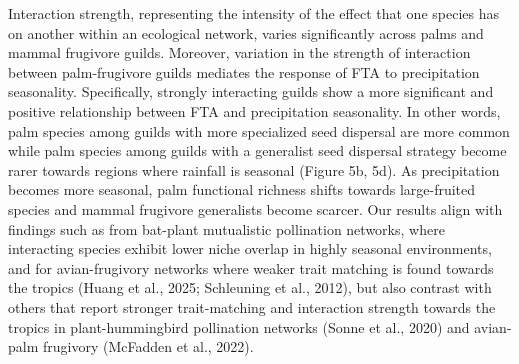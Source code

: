 \documentclass[
]{agujournal2019}
\begin{document}
Interaction strength, representing the intensity of the effect that one
species has on another within an ecological network, varies
significantly across palms and mammal frugivore guilds. Moreover,
variation in the strength of interaction between palm-frugivore guilds
mediates the response of FTA to precipitation seasonality. Specifically,
strongly interacting guilds show a more significant and positive
relationship between FTA and precipitation seasonality. In other words,
palm species among guilds with more specialized seed dispersal are more
common while palm species among guilds with a generalist seed dispersal
strategy become rarer towards regions where rainfall is seasonal (Figure
5b, 5d). As precipitation becomes more seasonal, palm functional
richness shifts towards large-fruited species and mammal frugivore
generalists become scarcer. Our results align with findings such as from
bat-plant mutualistic pollination networks, where interacting species
exhibit lower niche overlap in highly seasonal environments, and for
avian-frugivory networks where weaker trait matching is found towards
the tropics (Huang et al., 2025; Schleuning et al., 2012), but also
contrast with others that report stronger trait-matching and interaction
strength towards the tropics in plant-hummingbird pollination networks
(Sonne et al., 2020) and avian-palm frugivory (McFadden et al., 2022).
\end{document}
